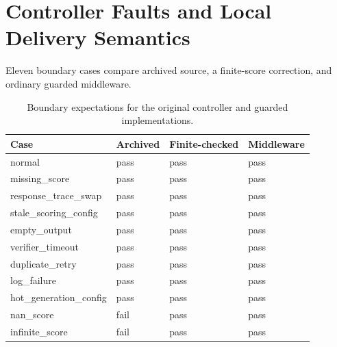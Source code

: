 \documentclass[journal,onecolumn]{IEEEtran}
\begin{document}
\section{Controller Faults and Local Delivery Semantics}
\label{sec:s8}
Eleven boundary cases compare archived source, a finite-score correction, and ordinary guarded middleware.
\begin{table}[H]
\centering
\caption{Boundary expectations for the original controller and guarded implementations.}\label{tab:fault-detail}
\footnotesize
\setlength{\tabcolsep}{4pt}
\begin{tabular}{@{}llll@{}}
\toprule
Case & Archived & Finite-checked & Middleware\\
\midrule
normal & pass & pass & pass\\
missing\_score & pass & pass & pass\\
response\_trace\_swap & pass & pass & pass\\
stale\_scoring\_config & pass & pass & pass\\
empty\_output & pass & pass & pass\\
verifier\_timeout & pass & pass & pass\\
duplicate\_retry & pass & pass & pass\\
log\_failure & pass & pass & pass\\
hot\_generation\_config & pass & pass & pass\\
nan\_score & fail & pass & pass\\
infinite\_score & fail & pass & pass\\
\bottomrule
\end{tabular}
\end{table}
\end{document}
